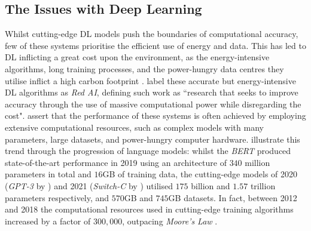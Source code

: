 \documentclass[a4paper, 11pt]{report}
\begin{document}
    \subsection{The Issues with Deep Learning}

    Whilst cutting-edge DL models push the boundaries of computational accuracy, few of these systems prioritise the efficient use of energy and data. This has led to DL inflicting a great cost upon the environment, as the energy-intensive algorithms, long training processes, and the power-hungry data centres they utilise inflict a high carbon footprint \citep{lacoste-2019}. \citet{schwartz-2019} label these accurate but energy-intensive DL algorithms as \emph{Red AI}, defining such work as ``research that seeks to improve accuracy through the use of massive computational power while disregarding the cost". \citet{schwartz-2019} assert that the performance of these systems is often achieved by employing extensive computational resources, such as complex models with many parameters, large datasets, and power-hungry computer hardware. \citet{bender-2021} illustrate this trend through the progression of language models: whilst the \emph{BERT} \citep{devlin-2018} produced state-of-the-art performance in 2019 using an architecture of $340$ million parameters in total and $16$GB of training data, the cutting-edge models of 2020 (\emph{GPT-3} by \citet{brown-2020}) and 2021 (\emph{Switch-C} by \citet{fedus-2021}) utilised $175$ billion and $1.57$ trillion parameters respectively, and $570$GB and $745$GB datasets. In fact, between 2012 and 2018 the computational resources used in cutting-edge training algorithms increased by a factor of $300,000$, outpacing \emph{Moore's Law} \citep{amodei-2018}.
\end{document}
